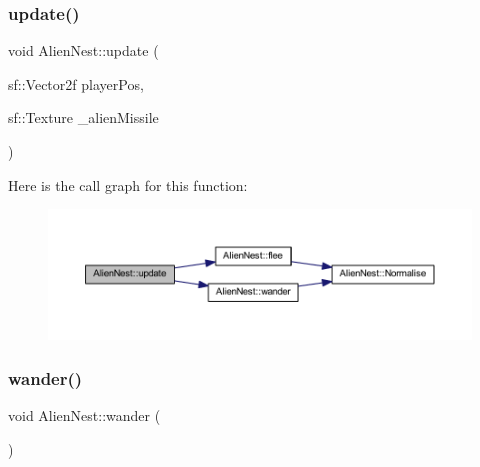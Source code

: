 \mbox{\label{class_alien_nest_a4dc29eea96da989af765ac1c0b92cbe0}} 
\subsubsection{\texorpdfstring{update()}{update()}}
{\footnotesize\ttfamily void Alien\+Nest\+::update (\begin{DoxyParamCaption}\item[{sf\+::\+Vector2f}]{player\+Pos,  }\item[{sf\+::\+Texture}]{\+\_\+alien\+Missile }\end{DoxyParamCaption})}

Here is the call graph for this function\+:
\nopagebreak
\begin{figure}[H]
\begin{center}
\leavevmode
\includegraphics[width=350pt]{class_alien_nest_a4dc29eea96da989af765ac1c0b92cbe0_cgraph}
\end{center}
\end{figure}
\mbox{\label{class_alien_nest_ac2679698409238879ace3367ceba6d9d}} 
\subsubsection{\texorpdfstring{wander()}{wander()}}
{\footnotesize\ttfamily void Alien\+Nest\+::wander (\begin{DoxyParamCaption}{ }\end{DoxyParamCaption})}

